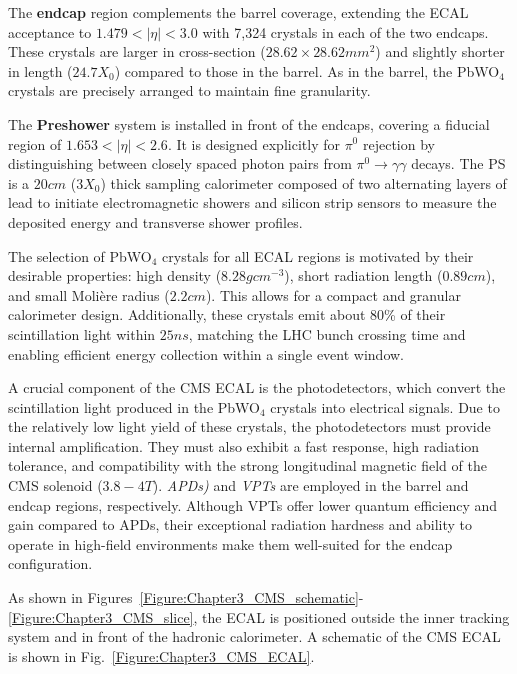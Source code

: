 The \textbf{endcap} region complements the barrel coverage, extending the ECAL acceptance to $1.479 < |\eta| < 3.0$ with 7,324 crystals in each of the two endcaps. These crystals are larger in cross-section ($28.62 \times 28.62\unit{mm}^2$) and slightly shorter in length ($24.7 X_0$) compared to those in the barrel. As in the barrel, the PbWO$_4$ crystals are precisely arranged to maintain fine granularity.

The \textbf{Preshower} system is installed in front of the endcaps, covering a fiducial region of $1.653 < |\eta| < 2.6$. It is designed explicitly for $\pi^0$ rejection by distinguishing between closely spaced photon pairs from $\pi^0 \to \gamma \gamma$ decays. The PS is a $20\unit{cm}$ ($3X_0$) thick sampling calorimeter composed of two alternating layers of lead to initiate electromagnetic showers and silicon strip sensors to measure the deposited energy and transverse shower profiles.

The selection of PbWO$_4$ crystals for all ECAL regions is motivated by their desirable properties: high density ($8.28\unit{gcm}^{-3}$), short radiation length ($0.89\unit{cm}$), and small Moli\`ere radius ($2.2\unit{cm}$). This allows for a compact and granular calorimeter design. Additionally, these crystals emit about 80\% of their scintillation light within $25\unit{ns}$, matching the LHC bunch crossing time and enabling efficient energy collection within a single event window.

A crucial component of the CMS ECAL is the photodetectors, which convert the scintillation light produced in the PbWO$_4$ crystals into electrical signals. Due to the relatively low light yield of these crystals, the photodetectors must provide internal amplification. They must also exhibit a fast response, high radiation tolerance, and compatibility with the strong longitudinal magnetic field of the CMS solenoid ($3.8-4\unit{T}$). \textit{\ac{APDs})} and \textit{\ac{VPTs}} are employed in the barrel and endcap regions, respectively. Although VPTs offer lower quantum efficiency and gain compared to APDs, their exceptional radiation hardness and ability to operate in high-field environments make them well-suited for the endcap configuration.

As shown in Figures~\ref{Figure:Chapter3_CMS_schematic}-\ref{Figure:Chapter3_CMS_slice}, the ECAL is positioned outside the inner tracking system and in front of the hadronic calorimeter. A schematic of the CMS ECAL is shown in Fig.~\ref{Figure:Chapter3_CMS_ECAL}.

